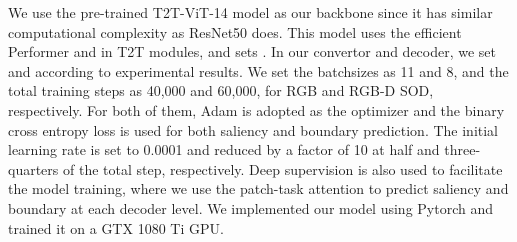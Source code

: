 \documentclass[10pt,twocolumn,letterpaper]{article}
\begin{document}
We use the pre-trained T2T-ViT-14 \cite{yuan2021tokens} model as our backbone since it has similar computational complexity as ResNet50 \cite{he2016resnet} does. This model uses the efficient Performer \cite{2020performer} and  in T2T modules, and sets . In our convertor and decoder, we set  and  according to experimental results.
We set the batchsizes as 11 and 8, and the total training steps as 40,000 and 60,000, for RGB and RGB-D SOD, respectively.
For both of them, Adam \cite{Adam2015} is adopted as the optimizer and the binary cross entropy loss is used for both saliency and boundary prediction.
The initial learning rate is set to 0.0001 and reduced by a factor of 10 at half and three-quarters of the total step, respectively.
Deep supervision is also used to facilitate the model training, where we use the patch-task attention to predict saliency and boundary at each decoder level.
We implemented our model using Pytorch \cite{paszke2019pytorch} and trained it on a GTX 1080 Ti GPU.
\end{document}
